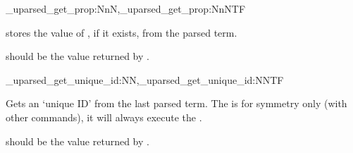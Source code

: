 \documentclass[10pt]{article}
\begin{document}
\begin{codedescribe}[code,new=2025/10/25,update=2025/12/08]{\starray_uparsed_get_prop:NnN,\starray_uparsed_get_prop:NnNTF}
\begin{codesyntax}%
\end{codesyntax}
 stores the value of , if it exists, from the parsed term. 
\end{codedescribe}
\begin{tsremark}
 should be the value returned by  .
\end{tsremark}

\begin{codedescribe}[code,new=2025/10/25,update=2025/12/08]{\starray_uparsed_get_unique_id:NN,\starray_uparsed_get_unique_id:NNTF}
\begin{codesyntax}%
\end{codesyntax}
Gets an `unique ID' from the last parsed term.   The   is  for symmetry only (with other commands), it will always execute the  .
\end{codedescribe}
\begin{tsremark}
 should be the value returned by  .
\end{tsremark}
\end{document}
